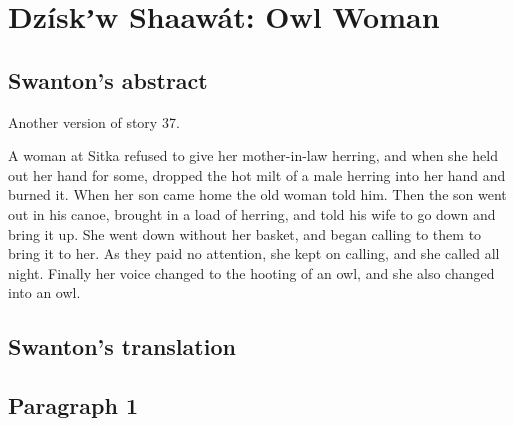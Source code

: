 
\resetexcnt
\chapter{Dzískʼw Shaawát: Owl Woman}\label{ch:98-owl-woman}

\section{Swanton’s abstract}\label{sec:98-swanton-abstract}

Another version of story 37.

A woman at Sitka refused to give her mother-in-law herring, and when she held out her hand for some, dropped the hot milt of a male herring into her hand and burned it.
When her son came home the old woman told him.
Then the son went out in his canoe, brought in a load of herring, and told his wife to go down and bring it up.
She went down without her basket, and began calling to them to bring it to her.
As they paid no attention, she kept on calling, and she called all night.
Finally her voice changed to the hooting of an owl, and she also changed into an owl.

\section{Swanton’s translation}\label{sec:98-swanton-translation}

\section{Paragraph 1}\label{sec:98-para-1}

